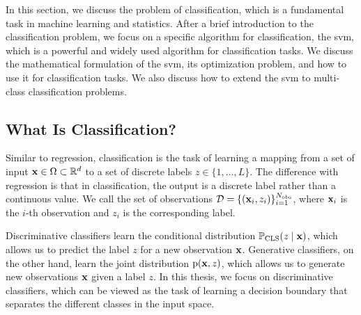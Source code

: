 In this section, we discuss the problem of classification, which is a fundamental task in machine learning and statistics. After a brief introduction to the classification problem, we focus on a specific algorithm for classification, the \gls{svm}, which is a powerful and widely used algorithm for classification tasks. We discuss the mathematical formulation of the \gls{svm}, its optimization problem, and how to use it for classification tasks. We also discuss how to extend the \gls{svm} to multi-class classification problems.


\subsection{What Is Classification?}
Similar to regression, classification is the task of learning a mapping from a set of input $\mathbf{x} \in \Omega \subset \mathbb{R}^d$ to a set of discrete labels $z \in \{1, \ldots, L\}$. The difference with regression is that in classification, the output is a discrete label rather than a continuous value. We call the set of observations $\mathcal{D} = \{(\mathbf{x}_i, z_i)\}_{i=1}^{N_{\mathrm{obs}}}$, where $\mathbf{x}_i$ is the $i$-th observation and $z_i$ is the corresponding label. 

\smallskip
Discriminative classifiers learn the conditional distribution $\mathbb{P}_{\mathrm{CLS}}(z \mid \mathbf{x})$, which allows us to predict the label $z$ for a new observation $\mathbf{x}$. Generative classifiers, on the other hand, learn the joint distribution $\mathrm{p}(\mathbf{x}, z)$, which allows us to generate new observations $\mathbf{x}$ given a label $z$. In this thesis, we focus on discriminative classifiers, which can be viewed as the task of learning a decision boundary that separates the different classes in the input space.


